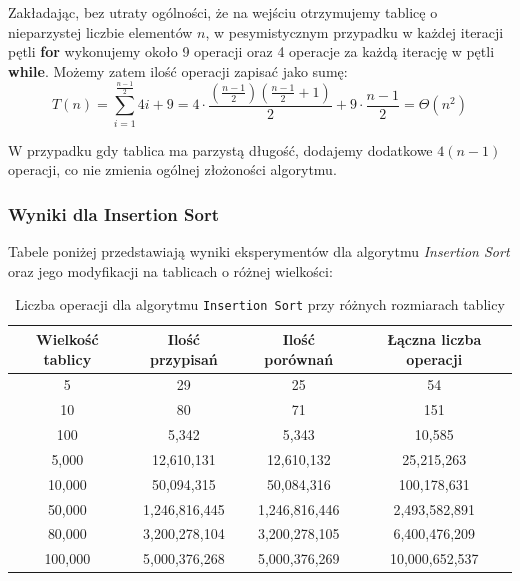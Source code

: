 \documentclass{article}
\begin{document}
Zakładając, bez utraty ogólności, że na wejściu otrzymujemy tablicę o nieparzystej liczbie elementów $n$, w pesymistycznym przypadku w każdej iteracji pętli \textbf{for} wykonujemy około 9 operacji oraz 4 operacje za każdą iterację w pętli \textbf{while}. Możemy zatem ilość operacji zapisać jako sumę:
\[
    T(n) = \sum_{i=1}^{\frac{n-1}{2}} 4i + 9 = 4 \cdot \frac{\left(\frac{n-1}{2}\right)\left(\frac{n-1}{2} + 1\right)}{2} + 9 \cdot \frac{n-1}{2} = \Theta(n^2)
\]

W przypadku gdy tablica ma parzystą długość, dodajemy dodatkowe $4(n-1)$ operacji, co nie zmienia ogólnej złożoności algorytmu.
\subsubsection{Wyniki dla Insertion Sort}
Tabele poniżej przedstawiają wyniki eksperymentów dla algorytmu \textit{Insertion Sort} oraz jego modyfikacji na tablicach o różnej wielkości:
\begin{table}[H]
    \centering
    \begin{tabular}{|c|c|c|c|}
    \hline
    \textbf{Wielkość tablicy} & \textbf{Ilość przypisań} & \textbf{Ilość porównań} & \textbf{Łączna liczba operacji} \\ \hline
    5 & 29 & 25 & 54 \\ \hline
    10 & 80 & 71 & 151 \\ \hline
    100 & 5,342 & 5,343 & 10,585 \\ \hline
    5,000 & 12,610,131 & 12,610,132 & 25,215,263 \\ \hline
    10,000 & 50,094,315 & 50,084,316 & 100,178,631 \\ \hline
    50,000 & 1,246,816,445 & 1,246,816,446 & 2,493,582,891 \\ \hline
    80,000 & 3,200,278,104 & 3,200,278,105 & 6,400,476,209 \\ \hline
    100,000 & 5,000,376,268 & 5,000,376,269 & 10,000,652,537 \\ \hline
    \end{tabular}
    \caption{Liczba operacji dla algorytmu \texttt{Insertion Sort} przy różnych rozmiarach tablicy}
    \label{tab:insertion_results}
\end{table}
\end{document}
